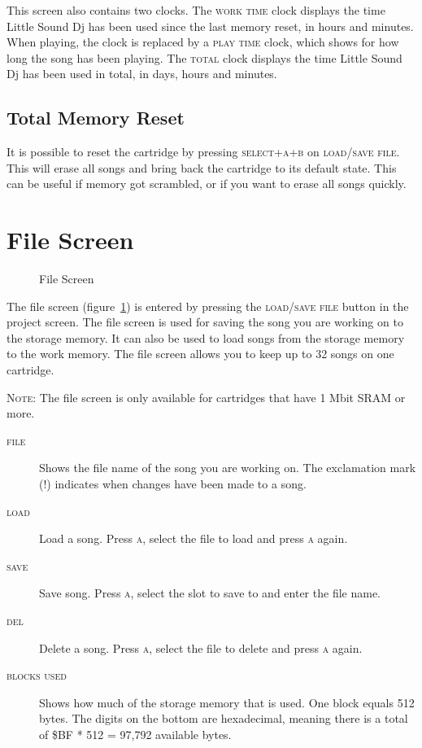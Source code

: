 This screen also contains two clocks. The \textsc{work time} clock displays the time Little Sound Dj has been used since the last memory reset, in hours and minutes. When playing, the clock
is replaced by a \textsc{play time} clock, which shows for how long the song has been playing. The \textsc{total} clock displays the time Little Sound Dj has been used in total, in days, hours and minutes.

\subsection{Total Memory Reset}
\label{total-memory-reset}

It is possible to reset the cartridge by pressing \textsc{select+a+b} on \textsc{load/save file}. This will erase all songs and bring back the cartridge to its default state. This can be useful if memory got scrambled, or if you want to erase all songs quickly.

\section{File Screen}

\begin{figure}[htpb]
	\begin{center}
	\end{center}
	\caption{File Screen}
	\label{fig:file}
\end{figure}

The file screen (figure~\ref{fig:file}) is entered by pressing the \textsc{load/save file} button in the project screen. The file screen is used for saving the song you are working on to the storage memory. It can also be used to load songs from the storage memory to the work memory. The file screen allows you to keep up to 32 songs on one cartridge.

\textsc{Note}: The file screen is only available for cartridges that have 1 Mbit SRAM or more.

\begin{description}
	\item[\textsc{file}] Shows the file name of the song you are working on. The exclamation mark (\textsc{!}) indicates when changes have been made to a song.
	\item[\textsc{load}] Load a song. Press \textsc{a}, select the file to load and press \textsc{a} again.
	\item[\textsc{save}] Save song. Press \textsc{a}, select the slot to save to and enter the file name.
	\item[\textsc{del}] Delete a song. Press \textsc{a}, select the file to delete and press \textsc{a} again.
	\item[\textsc{blocks used}] Shows how much of the storage memory that is used. One block equals 512 bytes. The digits on the bottom are hexadecimal, meaning there is a total of \$BF * 512 = 97,792 available bytes.
\end{description}

